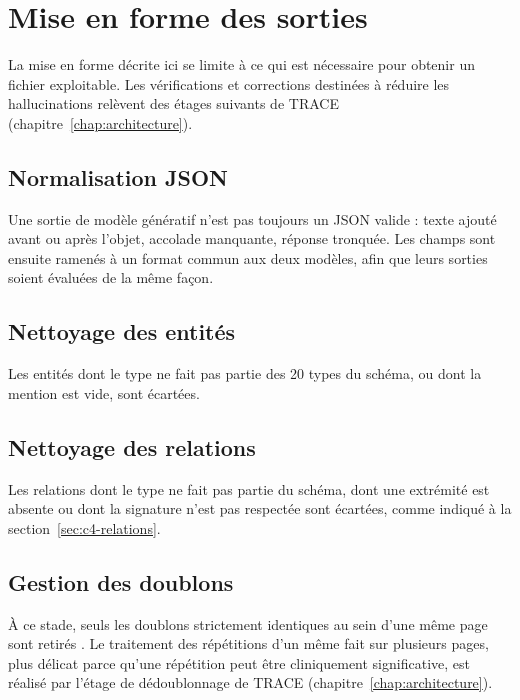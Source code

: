 \section{Mise en forme des sorties}\label{sec:c4-postproc}

La mise en forme décrite ici se limite à ce qui est nécessaire pour obtenir un fichier exploitable. Les vérifications et corrections destinées à réduire les hallucinations relèvent des étages suivants de TRACE (chapitre~\ref{chap:architecture}).

\subsection{Normalisation JSON}\label{sec:c4-norm-json}

Une sortie de modèle génératif n'est pas toujours un JSON valide : texte ajouté avant ou après l'objet, accolade manquante, réponse tronquée.  Les champs sont ensuite ramenés à un format commun aux deux modèles, afin que leurs sorties soient évaluées de la même façon.

\subsection{Nettoyage des entités}\label{sec:c4-nettoyage-entites}

Les entités dont le type ne fait pas partie des 20 types du schéma, ou dont la mention est vide, sont écartées. 

\subsection{Nettoyage des relations}\label{sec:c4-nettoyage-relations}

Les relations dont le type ne fait pas partie du schéma, dont une extrémité est absente ou dont la signature n'est pas respectée sont écartées, comme indiqué à la section~\ref{sec:c4-relations}.

\subsection{Gestion des doublons}\label{sec:c4-doublons}

À ce stade, seuls les doublons strictement identiques au sein d'une même page sont retirés . Le traitement des répétitions d'un même fait sur plusieurs pages, plus délicat parce qu'une répétition peut être cliniquement significative, est réalisé par l'étage de dédoublonnage de TRACE (chapitre~\ref{chap:architecture}).

